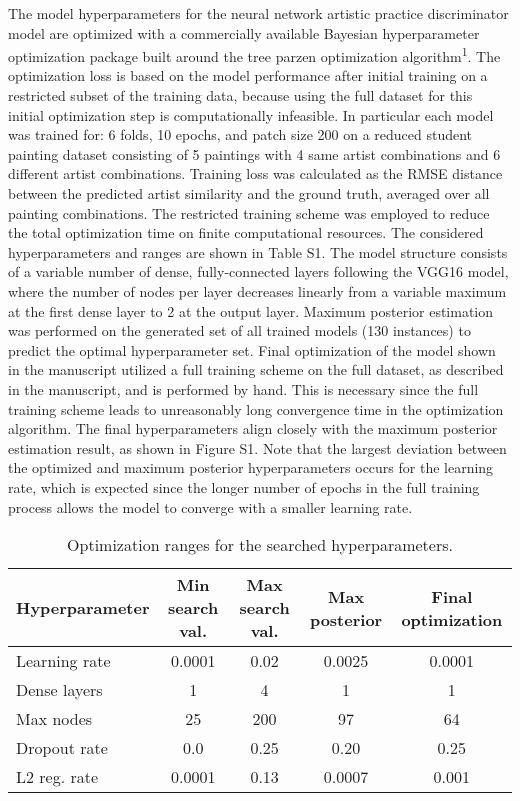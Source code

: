 \documentclass[11pt]{article}
\begin{document}
The model hyperparameters for the neural network artistic practice discriminator model are optimized with a commercially available Bayesian hyperparameter optimization package built around the tree parzen optimization algorithm\textsuperscript{1}. The optimization loss is based on the model performance after initial training on a restricted subset of the training data, because using the full dataset for this initial optimization step is computationally infeasible. In particular each model was trained for: 6 folds, 10 epochs, and patch size 200 on a reduced student painting dataset consisting of 5 paintings with 4 same artist combinations and 6 different artist combinations. Training loss was calculated as the RMSE distance between the predicted artist similarity and the ground truth, averaged over all painting combinations. The restricted training scheme was employed to reduce the total optimization time on finite computational resources. The considered hyperparameters and ranges are shown in Table S1. The model structure consists of a variable number of dense, fully-connected layers following the VGG16 model, where the number of nodes per layer decreases linearly from a variable maximum at the first dense layer to 2 at the output layer. Maximum posterior estimation was performed on the generated set of all trained models (130 instances) to predict the optimal hyperparameter set. Final optimization of the model shown in the manuscript utilized a full training scheme on the full dataset, as described in the manuscript, and is performed by hand. This is necessary since the full training scheme leads to unreasonably long convergence time in the optimization algorithm. The final hyperparameters align closely with the maximum posterior estimation result, as shown in Figure S1. Note that the largest deviation between the optimized and maximum posterior hyperparameters occurs for the learning rate, which is expected since the longer number of epochs in the full training process allows the model to converge with a smaller learning rate.

\begin{table}
\selectfont
\renewcommand{\arraystretch}{1.05}
\centering
\begin{tabular}{|l|c|c|c|c|}
\hline
\textbf{Hyperparameter}&\textbf{Min search val.}&\textbf{Max search val.}&\textbf{Max posterior}&\textbf{Final optimization}\\
\hline
Learning rate&0.0001&0.02&0.0025&0.0001\\
Dense layers&1&4&1&1\\
Max nodes&25&200&97&64\\
Dropout rate&0.0&0.25&0.20&0.25\\
L2 reg. rate&0.0001&0.13&0.0007&0.001\\ 
\hline
\end{tabular}
\caption{\selectfont Optimization ranges for the searched hyperparameters.}
\label{table:S1}

\end{table}
\end{document}
